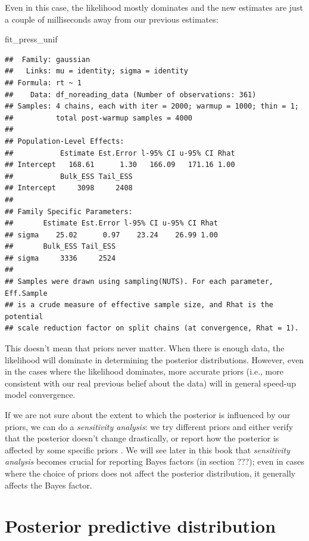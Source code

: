 \documentclass[12pt,]{krantz}
\newenvironment{Shaded}{\begin{snugshade}}{\end{snugshade}}
\newcommand{\NormalTok}[1]{#1}
\theoremstyle{definition}
\theoremstyle{definition}
\theoremstyle{definition}
\theoremstyle{remark}
\begin{document}
Even in this case, the likelihood mostly dominates and the new estimates are just a couple of milliseconds away from our previous estimates:

\begin{Shaded}
\begin{Highlighting}[]
\NormalTok{fit_press_unif}
\end{Highlighting}
\end{Shaded}

\begin{verbatim}
##  Family: gaussian 
##   Links: mu = identity; sigma = identity 
## Formula: rt ~ 1 
##    Data: df_noreading_data (Number of observations: 361) 
## Samples: 4 chains, each with iter = 2000; warmup = 1000; thin = 1;
##          total post-warmup samples = 4000
## 
## Population-Level Effects: 
##           Estimate Est.Error l-95% CI u-95% CI Rhat
## Intercept   168.61      1.30   166.09   171.16 1.00
##           Bulk_ESS Tail_ESS
## Intercept     3098     2408
## 
## Family Specific Parameters: 
##       Estimate Est.Error l-95% CI u-95% CI Rhat
## sigma    25.02      0.97    23.24    26.99 1.00
##       Bulk_ESS Tail_ESS
## sigma     3336     2524
## 
## Samples were drawn using sampling(NUTS). For each parameter, Eff.Sample 
## is a crude measure of effective sample size, and Rhat is the potential 
## scale reduction factor on split chains (at convergence, Rhat = 1).
\end{verbatim}

This doesn't mean that priors never matter. When there is enough data, the likelihood will dominate in determining the posterior distributions. However, even in the cases where the likelihood dominates, more accurate priors (i.e., more consistent with our real previous belief about the data) will in general speed-up model convergence.

If we are not sure about the extent to which the posterior is influenced by our priors, we can do a \emph{sensitivity analysis}: we try different priors and either verify that the posterior doesn't change drastically, or report how the posterior is affected by some specific priors \citep[for a published example in psycholinguistics, see][]{vasishthProcessingChineseRelative2013}. We will see later in this book that \emph{sensitivity analysis} becomes crucial for reporting Bayes factors (in section ???); even in cases where the choice of priors does not affect the posterior distribution, it generally affects the Bayes factor.

\hypertarget{sec:ppd}{%
\section{Posterior predictive distribution}\label{sec:ppd}}
\end{document}
